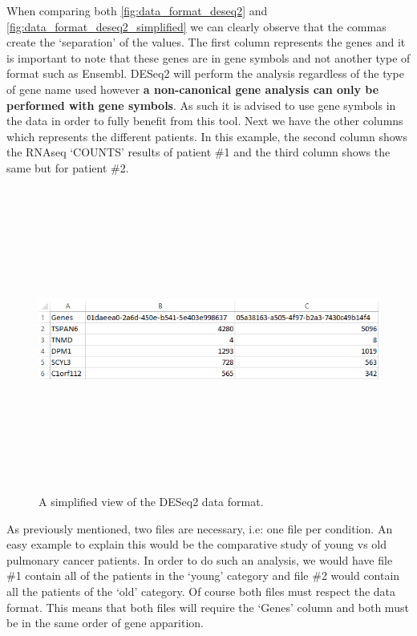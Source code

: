\documentclass[11pt]{article}
\begin{document}
When comparing both \autoref{fig:data_format_deseq2} and \autoref{fig:data_format_deseq2_simplified} we can clearly observe that the commas create the `separation' of the values. 
The first column represents the genes and it is important to note that these genes are in gene symbols and not another type of format such as Ensembl. \acrshort{DESeq2} will perform the analysis regardless of the type of gene name used however \textbf{a non-canonical gene analysis can only be performed with gene symbols}. As such it is advised to use gene symbols in the data in order to fully benefit from this tool. Next we have the other columns which represents the different patients. In this example, the second column shows the RNAseq `COUNTS' results of patient \#1 and the third column shows the same but for patient \#2.
\begin{figure}[h!]
\centering
\includegraphics[width=15cm,height=10cm,keepaspectratio]{dese2_excel_data_format.png}
\caption{A simplified view of the \acrshort{DESeq2} data format.}
\label{fig:data_format_deseq2_simplified}
\end{figure}

As previously mentioned, two files are necessary, i.e: one file per condition. An easy example to explain this would be the comparative study of young vs old pulmonary cancer patients. In order to do such an analysis, we would have file \#1 contain all of the patients in the `young' category and file \#2 would contain all the patients of the `old' category. Of course both files must respect the data format. This means that both files will require the `Genes' column and both must be in the same order of gene apparition.
\end{document}
